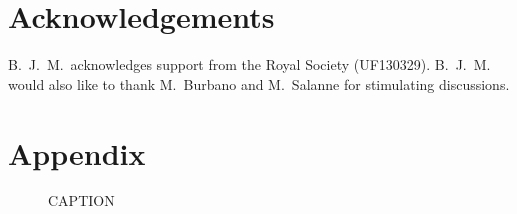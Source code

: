 \documentclass[aps,prb,twocolumn,superscriptaddress,reprint]{revtex4-1}
\begin{document}
\section{Acknowledgements}
B.\ J.\ M.\ acknowledges support from the Royal Society (UF130329). 
B.\ J.\ M. would also like to thank M.~Burbano and M.~Salanne for stimulating discussions.


\section{Appendix}

\begin{figure}[tb]
  \centering
    \caption{\label{fig:correlation_miniplots}CAPTION}
\end{figure}
\end{document}
